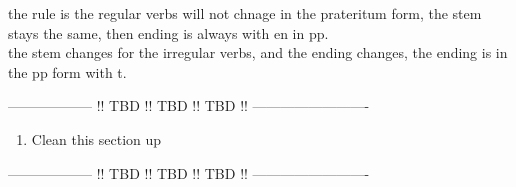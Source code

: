\documentclass[a4paper,12pt]{article}
\begin{document}
the rule is the regular verbs will not chnage in the prateritum form, the stem
stays the same, then ending is always with en in pp.\\

\noindent
the stem changes for the irregular verbs, and the ending changes, the ending is
in the pp form with t.\\


\begin{center}
\color{red}
------------------ !! TBD !! TBD !! TBD !! -------------------------

\begin{enumerate}[noitemsep]
	\item Clean this section up
\end{enumerate}

------------------ !! TBD !! TBD !! TBD !! -------------------------
\color{black}
\end{center}




\end{document}
